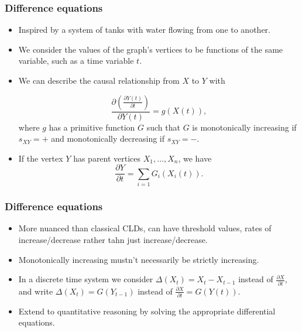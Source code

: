 \documentclass{beamer}
\begin{document}
\begin{frame}
\frametitle{Difference equations}
\begin{itemize}
\item Inspired by a system of tanks with water flowing from one to another.

\item We consider the values of the graph's vertices to be functions of the
same variable, such as a time variable $t$.

\item We can describe the causal relationship from $X$ to $Y$ with

\[\frac{\partial\left( \frac{\partial Y(t)}{\partial t} \right)}{\partial Y(t)} = g(X(t)),\]
where $g$ has a primitive function $G$ such that $G$ is monotonically increasing if $s_{XY}=+$ and monotonically decreasing if $s_{XY}= -$.
\item If the vertex $Y$ has parent vertices $X_1,\ldots,X_n$, we have
\[\frac{\partial Y}{\partial t} = \sum_{i=1}G_i(X_i(t)).\]

\end{itemize}

\end{frame}
\begin{frame}
\frametitle{Difference equations}
\begin{itemize}
\item More nuanced than classical CLDs, can have threshold values, rates of
  increase/decrease rather tahn just increase/decrease.

\item Monotonically increasing mustn't necessarily be strictly increasing.

\item In a discrete time system we consider $\Delta(X_t) = X_t - X_{t-1}$
instead of $\frac{\partial X}{\partial t}$, and write
$\Delta(X_t) = G(Y_{t-1})$ instead of
$\frac{\partial X}{\partial t} = G(Y(t))$.

\item Extend to quantitative reasoning by solving the
appropriate differential equations.

\end{itemize}
\end{frame}
\end{document}
